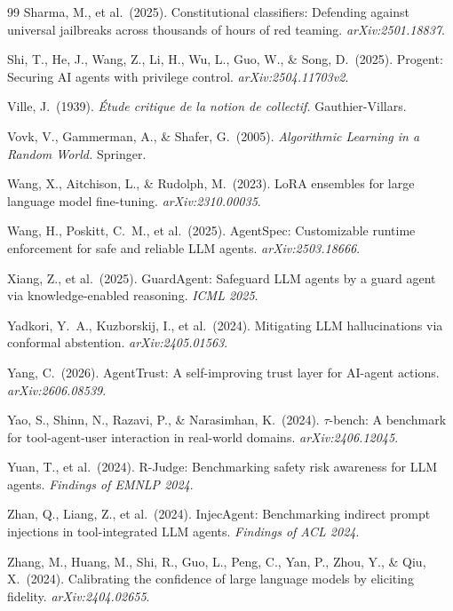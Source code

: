 \documentclass[10pt,twocolumn]{article}
\begin{document}
\begin{thebibliography}{99}
Sharma, M., et al.\ (2025).
Constitutional classifiers: Defending against universal jailbreaks across
thousands of hours of red teaming.
\emph{arXiv:2501.18837}.

Shi, T., He, J., Wang, Z., Li, H., Wu, L., Guo, W., \& Song, D.\ (2025).
Progent: Securing AI agents with privilege control.
\emph{arXiv:2504.11703v2}.

Ville, J.\ (1939).
\emph{\'Etude critique de la notion de collectif.}
Gauthier-Villars.

Vovk, V., Gammerman, A., \& Shafer, G.\ (2005).
\emph{Algorithmic Learning in a Random World.}
Springer.

Wang, X., Aitchison, L., \& Rudolph, M.\ (2023).
LoRA ensembles for large language model fine-tuning.
\emph{arXiv:2310.00035}.

Wang, H., Poskitt, C.~M., et al.\ (2025).
AgentSpec: Customizable runtime enforcement for safe and reliable LLM
agents.
\emph{arXiv:2503.18666}.

Xiang, Z., et al.\ (2025).
GuardAgent: Safeguard LLM agents by a guard agent via knowledge-enabled
reasoning.
\emph{ICML 2025}.

Yadkori, Y.~A., Kuzborskij, I., et al.\ (2024).
Mitigating LLM hallucinations via conformal abstention.
\emph{arXiv:2405.01563}.

Yang, C.\ (2026).
AgentTrust: A self-improving trust layer for AI-agent actions.
\emph{arXiv:2606.08539}.

Yao, S., Shinn, N., Razavi, P., \& Narasimhan, K.\ (2024).
$\tau$-bench: A benchmark for tool-agent-user interaction in real-world
domains.
\emph{arXiv:2406.12045}.

Yuan, T., et al.\ (2024).
R-Judge: Benchmarking safety risk awareness for LLM agents.
\emph{Findings of EMNLP 2024}.

Zhan, Q., Liang, Z., et al.\ (2024).
InjecAgent: Benchmarking indirect prompt injections in tool-integrated LLM
agents.
\emph{Findings of ACL 2024}.

Zhang, M., Huang, M., Shi, R., Guo, L., Peng, C., Yan, P., Zhou, Y.,
\& Qiu, X.\ (2024).
Calibrating the confidence of large language models by eliciting fidelity.
\emph{arXiv:2404.02655}.


\end{thebibliography}
\end{document}

